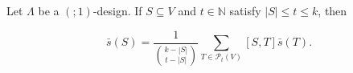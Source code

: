 Let $\Lambda$ be a $(; 1)$-design. If $S \subseteq V$ and $t \in \mathbb{N}$ satisfy $|S| \leq t \leq k$, then

$$\bar{s}(S) = \frac{1}{\binom{k-|S|}{t-|S|}} \sum_{T \in \mathcal{P}_t(V)} [S, T] \bar{s}(T).$$
